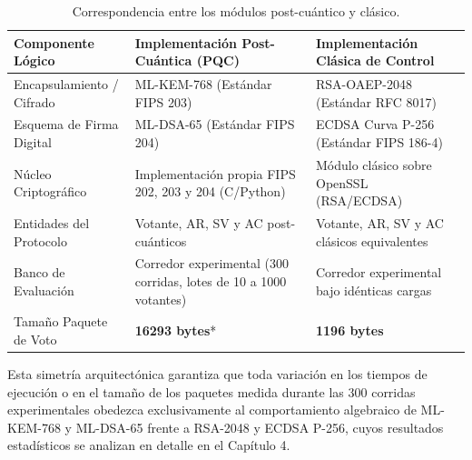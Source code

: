 \begingroup
\renewcommand{\arraystretch}{1.2}
\setlength{\tabcolsep}{4pt}
\begin{table}[!htbp]
	\centering
	\footnotesize
	\begin{tabular}{|>{\raggedright\arraybackslash}p{3.2cm}|>{\raggedright\arraybackslash}p{5.0cm}|>{\raggedright\arraybackslash}p{5.4cm}|}
		\hline
		\textbf{Componente Lógico} & \textbf{Implementación Post-Cuántica (PQC)} & \textbf{Implementación Clásica de Control} \\
		\hline
		Encapsulamiento / Cifrado & ML-KEM-768 (Estándar FIPS 203) & RSA-OAEP-2048 (Estándar RFC 8017) \\
		\hline
		Esquema de Firma Digital & ML-DSA-65 (Estándar FIPS 204) & ECDSA Curva P-256 (Estándar FIPS 186-4) \\
		\hline
		Núcleo Criptográfico & Implementación propia FIPS 202, 203 y 204 (C/Python) & Módulo clásico sobre OpenSSL (RSA/ECDSA) \\
		\hline
		Entidades del Protocolo & Votante, AR, SV y AC post-cuánticos & Votante, AR, SV y AC clásicos equivalentes \\
		\hline
		Banco de Evaluación & Corredor experimental (300 corridas, lotes de 10 a 1000 votantes) & Corredor experimental bajo idénticas cargas \\
		\hline
		Tamaño Paquete de Voto & \textbf{16293 bytes}* & \textbf{1196 bytes} \\
		\hline
	\end{tabular}
	\caption{Correspondencia entre los módulos post-cuántico y clásico.}
	\label{tab:correspondencia_modulos_didactico}
	\par{}
\end{table}
\endgroup

Esta simetría arquitectónica garantiza que toda variación en los tiempos de ejecución o en el tamaño de los paquetes medida durante las 300 corridas experimentales obedezca exclusivamente al comportamiento algebraico de ML-KEM-768 y ML-DSA-65 frente a RSA-2048 y ECDSA P-256, cuyos resultados estadísticos se analizan en detalle en el Capítulo 4.
